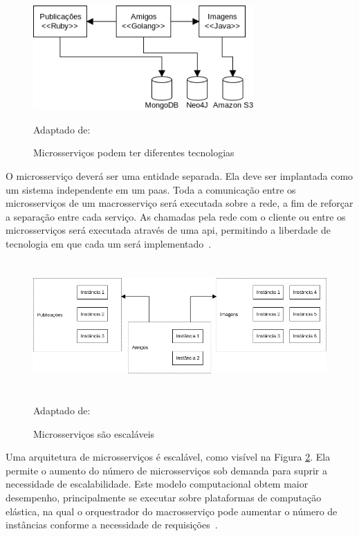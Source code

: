 \begin{figure}[htb!]
\caption{Microsserviços podem ter diferentes tecnologias}
\label{fig:microsservicos_tecnologias}
\includegraphics[height=4cm]{img/cap2/microsservicos_tecnologias.png}
\centering

Adaptado de:~\cite{Newman2015Feb}
\end{figure}

O microsserviço deverá ser uma entidade separada. Ela deve ser implantada como um sistema independente em um \ac{paas}.
%
Toda a comunicação entre os microsserviços de um macrosserviço será executada sobre a rede, a fim de reforçar a separação entre cada serviço.
%
As chamadas pela rede com o cliente ou entre os microsserviços será executada através de uma \ac{api}, permitindo a liberdade de tecnologia em que cada um será implementado~\cite{Newman2015Feb}.



\begin{figure}[htb!]
\caption{Microsserviços são escaláveis}
\label{fig:microsservicos_escalabilidade}
\includegraphics[height=5cm]{img/cap2/microsservicos_escalabilidade.png}
\centering

Adaptado de:~\cite{Newman2015Feb}
\end{figure}



Uma arquitetura de microsserviços é escalável, como visível na Figura \ref{fig:microsservicos_escalabilidade}.
%
Ela permite o aumento do número de microsserviços sob demanda para suprir a necessidade de escalabilidade.
%
Este modelo computacional obtem maior desempenho, principalmente se executar sobre plataformas de computação elástica, na qual o orquestrador do macrosserviço pode aumentar o número de instâncias conforme a necessidade de requisições~\cite{Nadareishvili2016Aug}.



